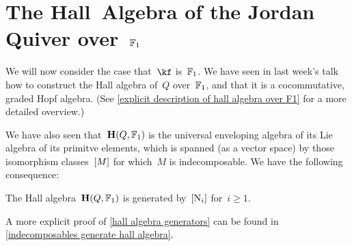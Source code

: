 \documentclass[a4paper,11pt]{scrartcl}
\begin{document}
\section{The Hall~Algebra of the Jordan Quiver over~$\mathbb{F}_1$}

We will now consider the case that~$\kf$ is~$\mathbb{F}_1$.
We have seen in last week’s talk how to construct the Hall algebra of~$Q$ over~$\mathbb{F}_1$, and that it is a cocommutative, graded Hopf algebra.
(See \cref{explicit description of hall algebra over F1} for a more detailed overview.)

We have also seen that~$\mathbf{H}(Q, \mathbb{F}_1)$ is the universal enveloping algebra of its Lie algebra of its primitve elements, which is spanned (as a vector space) by those isomorphism classes~$[M]$ for which~$M$ is indecomposable.
We have the following consequence:

\begin{corollary}
  \label{hall algebra generators}
  The Hall algebra~$\mathbf{H}(Q, \mathbb{F}_1)$ is generated by~$[\mathrm{N}_i]$ for~$i \geq 1$.
\end{corollary}

A more explicit proof of \cref{hall algebra generators} can be found in \cref{indecomposables generate hall algebra}.
\end{document}
